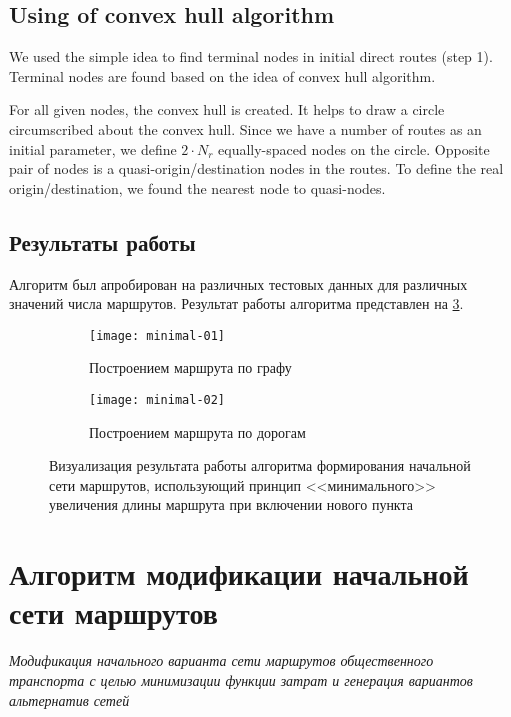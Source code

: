 \subsection{Using of convex hull algorithm}
We used the simple idea to find terminal nodes in initial direct routes (step 1). Terminal nodes are found 
based on  the idea of convex hull algorithm. 

For all given nodes, the convex hull is created. It helps to draw a circle circumscribed about the convex 
hull. Since we have a number of routes as an initial parameter, we define \( 2\cdot N_r \) equally-spaced 
nodes on the circle. Opposite pair of nodes is a quasi-origin/destination nodes in the routes. To define 
the real origin/destination, we found the nearest node to quasi-nodes.

\subsection{Результаты работы}
Алгоритм был апробирован на различных тестовых данных для различных значений числа маршрутов. 
Результат работы алгоритма представлен на \ref{img:min-length-01}.
\begin{figure}[h!]
    \centering
    \begin{subfigure}{0.47\textwidth}
        \texttt{[image: minimal-01]}
        \caption{Построением маршрута по графу}
        \label{fig:graph}
    \end{subfigure}
    \begin{subfigure}{0.47\textwidth}
        \texttt{[image: minimal-02]}
        \caption{Построением маршрута по дорогам}
        \label{fig:osrm}
    \end{subfigure}
    \caption{Визуализация результата работы алгоритма формирования начальной сети маршрутов, 
        использующий принцип <<минимального>> увеличения длины маршрута при включении нового пункта%
    }
   \label{img:min-length-01}
\end{figure}


\section{Алгоритм модификации начальной сети маршрутов}
\emph{Модификация начального варианта сети маршрутов общественного транспорта с целью минимизации функции 
затрат и генерация вариантов альтернатив сетей}
